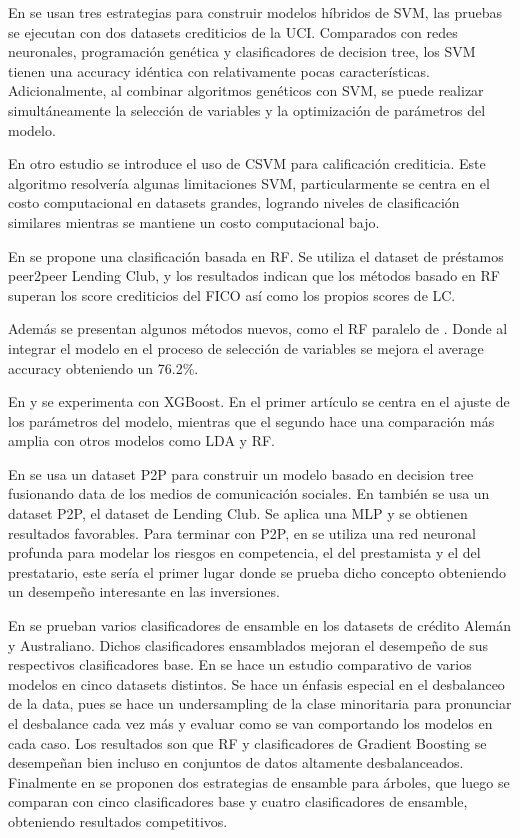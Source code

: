 En \cite{huang2007credit} se usan tres estrategias para construir modelos híbridos de \ac{SVM}, las pruebas se ejecutan con dos datasets crediticios de la UCI. Comparados con redes neuronales, programación genética y clasificadores de decision tree, los \ac{SVM} tienen una accuracy idéntica con relativamente pocas características. Adicionalmente, al combinar algoritmos genéticos con \ac{SVM}, se puede realizar simultáneamente la selección de variables y la optimización de parámetros del modelo. 

En otro estudio \cite{harris2015credit} se introduce el uso de \ac{CSVM} para calificación crediticia. Este algoritmo resolvería algunas limitaciones \ac{SVM}, particularmente se centra en el costo computacional en datasets grandes, logrando niveles de clasificación similares mientras se mantiene un costo computacional bajo.

En \cite{malekipirbazari2015risk} se propone una clasificación basada en \ac{RF}. Se utiliza el dataset de préstamos peer2peer Lending Club, y los resultados indican que los métodos basado en \ac{RF} superan los score crediticios del FICO así como los propios scores de LC.

Además se presentan algunos métodos nuevos, como el \ac{RF} paralelo de \cite{van2016novel}. Donde al integrar el modelo en el proceso de selección de variables se mejora el average accuracy obteniendo un 76.2\%.

En \cite{xia2017boosted} y \cite{bhatia2017credit} se experimenta con \ac{XGBoost}. En el primer artículo se centra en el ajuste de los parámetros del modelo, mientras que el segundo hace una comparación más amplia con otros modelos como \ac{LDA} y \ac{RF}.

En \cite{zhang2016research} se usa un dataset P2P para construir un modelo basado en decision tree fusionando data de los medios de comunicación sociales. En \cite{zang2014credit} también se usa un dataset P2P, el dataset de Lending Club. Se aplica una \ac{MLP} y se obtienen resultados favorables. Para terminar con P2P, en \cite{tan2018deep} se utiliza una red neuronal profunda para modelar los riesgos en competencia, el del prestamista y el del prestatario, este sería el primer lugar donde se prueba dicho concepto obteniendo un desempeño interesante en las inversiones.

En \cite{nanni2009experimental} se prueban varios clasificadores de ensamble en los datasets de crédito Alemán y Australiano. Dichos clasificadores ensamblados mejoran el desempeño de sus respectivos clasificadores base. En \cite{brown2012experimental} se hace un estudio comparativo de varios modelos en cinco datasets distintos. Se hace un énfasis especial en el desbalanceo de la data, pues se hace un undersampling de la clase minoritaria para pronunciar el desbalance cada vez más y evaluar como se van comportando los modelos en cada caso. Los resultados son que \ac{RF} y clasificadores de Gradient Boosting se desempeñan bien incluso en conjuntos de datos altamente desbalanceados. Finalmente en \cite{wang2012two} se proponen dos estrategias de ensamble para árboles, que luego se comparan con cinco clasificadores base y cuatro clasificadores de ensamble, obteniendo resultados competitivos.


